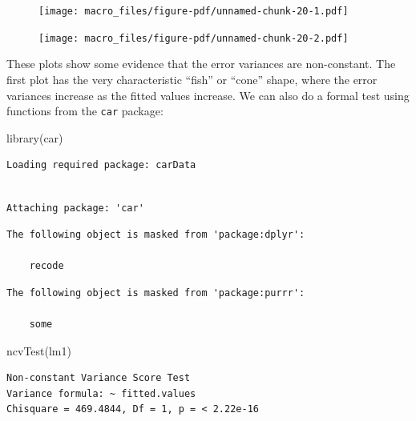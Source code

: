 \documentclass[
  letterpaper,
  DIV=11,
  numbers=noendperiod]{scrreprt}
\newenvironment{Shaded}{\begin{snugshade}}{\end{snugshade}}
\newcommand{\FunctionTok}[1]{\textcolor[rgb]{0.28,0.35,0.67}{#1}}
\newcommand{\NormalTok}[1]{\textcolor[rgb]{0.00,0.23,0.31}{#1}}
\begin{document}
\begin{figure}[H]

{\centering \texttt{[image: macro\_files/figure-pdf/unnamed-chunk-20-1.pdf]}

}

\end{figure}

\begin{figure}[H]

{\centering \texttt{[image: macro\_files/figure-pdf/unnamed-chunk-20-2.pdf]}

}

\end{figure}

These plots show some evidence that the error variances are
non-constant. The first plot has the very characteristic ``fish'' or
``cone'' shape, where the error variances increase as the fitted values
increase. We can also do a formal test using functions from the
\texttt{car} package:

\begin{Shaded}
\begin{Highlighting}[]
\FunctionTok{library}\NormalTok{(car)}
\end{Highlighting}
\end{Shaded}

\begin{verbatim}
Loading required package: carData
\end{verbatim}

\begin{verbatim}

Attaching package: 'car'
\end{verbatim}

\begin{verbatim}
The following object is masked from 'package:dplyr':

    recode
\end{verbatim}

\begin{verbatim}
The following object is masked from 'package:purrr':

    some
\end{verbatim}

\begin{Shaded}
\begin{Highlighting}[]
\FunctionTok{ncvTest}\NormalTok{(lm1)}
\end{Highlighting}
\end{Shaded}

\begin{verbatim}
Non-constant Variance Score Test 
Variance formula: ~ fitted.values 
Chisquare = 469.4844, Df = 1, p = < 2.22e-16
\end{verbatim}
\end{document}
